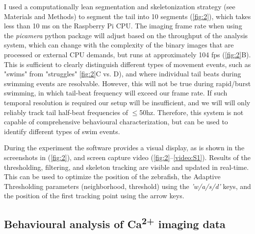\documentclass[9pt,lineno]{RandlettLab_elife}
\begin{document}
\begin{figure}
\begin{fullwidth}
\begin{center}
\label{video:S1}


\end{center}
\end{fullwidth}
\end{figure}


I used a computationally lean segmentation and skeletonization strategy (see Materials and Methods) to segment the tail into 10 segments (\autoref{fig:2}), which takes less than 10 ms on the Raspberry Pi CPU. The imaging frame rate when using the \emph{picamera} python package will adjust based on the throughput of the analysis system, which can change with the complexity of the binary images that are processed or external CPU demands, but runs at approximately 104 fps (\autoref{fig:2}B). This is sufficient to clearly distinguish different types of movement events, such as "swims" from "struggles" \autoref{fig:2}C vs. D), and where individual tail beats during swimming events are resolvable. However, this will not be true during rapid/burst swimming, in which tail-beat frequency will exceed our frame rate. If such temporal resolution is required our setup will be insufficient, and we will will only reliably track tail half-beat frequencies of $\leq$50hz. Therefore, this system is not capable of comprehensive behavioural characterization, but can be used to identify different types of swim events. 

During the experiment the software provides a visual display, as is shown in the screenshots in (\autoref{fig:2}), and screen capture video (\autoref{fig:2}--\autoref{video:S1}). Results of the thresholding, filtering, and skeleton tracking are visible and updated in real-time. This can be used to optimize the position of the zebrafish, the Adaptive Thresholding parameters (neighborhood, threshold) using the \emph{'w/a/s/d'} keys, and the position of the first tracking point using the arrow keys.

\subsection{Behavioural analysis of Ca\textsuperscript{2+} imaging data}
\end{document}
